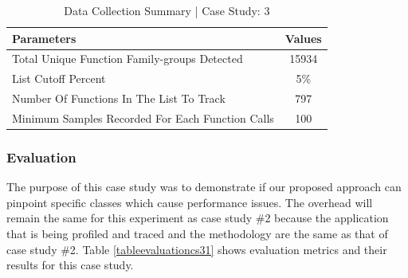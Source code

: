 \documentclass[pdflatex,sn-nature]{sn-jnl}%
\theoremstyle{thmstyleone}%
\theoremstyle{thmstyletwo}%
\theoremstyle{thmstylethree}%
\begin{document}
\begin{table}[tbp]

\centering
\begin{tabular}{ |l|c| }
\hline
\textbf{Parameters} & \textbf{Values} \\
\hline
Total Unique Function Family-groups Detected & 15934 \\
\hline
List Cutoff Percent & 5\% \\
\hline
Number Of Functions In The List To Track & 797 \\
\hline
Minimum Samples Recorded For Each Function Calls & 100 \\
\hline
\end{tabular}%
\caption{Data Collection Summary | Case Study: 3}
\label{tabledatacollectioncs3}
\end{table}


\subsubsection{Evaluation}

The purpose of this case study was to demonstrate if our proposed approach can pinpoint specific classes which cause performance issues. The overhead will remain the same for this experiment as case study \#2 because the application that is being profiled and traced and the methodology are the same as that of case study \#2. Table \ref{tableevaluationcs31} shows evaluation metrics and their results for this case study.

\begin{table}[tbp]

\centering
{}
\caption{Evaluation | Issue: Extremely Slow 3D Transformation Rendering With Firefox | Case Study: 3}
\label{tableevaluationcs31}
\end{table}
\end{document}
